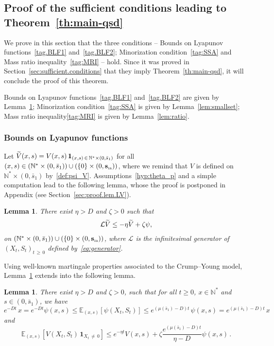\documentclass[10pt]{amsart}
\newtheorem{lemm}[theo]{Lemma}\newtheorem{prop}[theo]{Proposition}\newtheorem{coro}[theo]{Corollary}\newtheorem{conj}[theo]{Conjecture}
\theoremstyle{definition}\newtheorem{defi}[theo]{Definition}\newtheorem{rema}[theo]{Remark}\newtheorem{exam}[theo]{Example}\newtheorem{exem}[theo]{Example}\newtheorem{nota}[theo]{Notation}
\newcommand{\NN}{\mathbb{N}}
\newcommand{\EE}{\mathbb{E}}
\newcommand{\clL}{\mathcal{L}}
\newcommand{\Sin}{{\mathbf s}_{\textrm{\tiny\rm in}}}
\newcommand{\1}{\mathbf{1}}
\let\oldtilde\tilde
\renewcommand*{\tilde}[1]{\mathchoice{\widetilde{#1}}{\widetilde{#1}}{\oldtilde{#1}}{\oldtilde{#1}}}
\begin{document}
\subsection{Proof of the sufficient conditions leading to Theorem~\ref{th:main-qsd}}\label{sec:QS.behavior}


We prove in this section that the three conditions -- Bounds on Lyapunov functions~\eqref{tag.BLF1} and~\eqref{tag.BLF2}; Minorization condition~\eqref{tag:SSA} and Mass ratio inequality~\eqref{tag:MRI} -- hold. Since it was proved in Section~\ref{sec:sufficient.conditions} that they imply Theorem~\ref{th:main-qsd}, it will conclude the proof of this theorem.

Bounds on Lyapunov functions~\eqref{tag.BLF1} and~\eqref{tag.BLF2} are given by Lemma~\ref{lem:lyapunov}; Minorization condition~\eqref{tag:SSA} is given by Lemma~\ref{lem:smallset}; Mass ratio inequality\eqref{tag:MRI} is given by Lemma~\ref{lem:ratio}.

\subsubsection{Bounds on Lyapunov functions}\label{sec:lyapunov}


Let $\tilde V(x,s)=V(x,s)\,\1_{(x,s)\,\in\,\NN^*\times(0,\bar s_1)}$ for all $(x,s)\in (\NN^*\times(0,\bar s_1)) \cup (\{0\}\times (0,\Sin))$, where we remind that $V$ is defined on $\NN^*\times(0,\bar s_1)$ by~\eqref{def:psi_V}. Assumptions~\eqref{hyp:theta_p} and a simple computation lead to the following lemma, whose the proof is postponed in Appendix (see Section~\ref{sec:proof.lem.LV}).

\begin{lemm}\label{lem:LV}
There exist $\eta>D$ and $\zeta>0$ such that
\[
\clL \tilde V \leq -\eta \tilde V + \zeta \psi,
\]
on $(\NN^*\times(0,\bar s_1)) \cup (\{0\}\times (0,\Sin))$, where $\clL$ is the infinitesimal generator of $(X_t,S_t)_{t\,\geq\,0}$ defined by~\eqref{eq:generator}.
\end{lemm}

Using well-known martingale properties associated to the Crump--Young model, Lemma~\ref{lem:LV} extends into the following lemma.


\begin{lemm}\label{lem:lyapunov}
There exist $\eta>D$ and $\zeta>0$, such that for all $t\geq 0$, $x\in \NN^*$ and $s\in (0,\bar s_1)$, we have
\begin{equation}\label{eq:encadrepsi}
e^{-D t}\, x = e^{-D t} \psi(x,s)
\leq \EE_{(x,s)}\left[\psi\left(X_t, S_t\right)\right]
\leq e^{\left(\mu\left(\bar s_1\right)-D\right) t}\, \psi(x,s)= e^{\left(\mu\left(\bar s_1\right)-D\right) t} \,x
\end{equation}
and
\begin{equation}\label{eq:V}
\EE_{(x,s)}\left[V\left(X_t,S_t\right) \, \1_{X_t\,\neq\,0}\right] \leq e^{-\eta t} V(x,s) + \zeta \frac{e^{\left(\mu(\bar s_1)-D\right)t}}{\eta-D} \psi(x,s)\,.
\end{equation}
\end{lemm}
\end{document}
